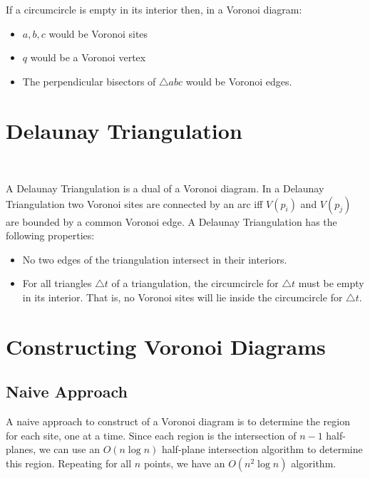 \begin{center}
\end{center}

If a circumcircle is empty in its interior then, in a Voronoi diagram:
\begin{itemize}
\item $a,b,c$ would be Voronoi sites
\item $q$ would be a Voronoi vertex
\item The perpendicular bisectors of $\triangle abc$ would be Voronoi
edges.
\end{itemize}


\section{Delaunay Triangulation}

\begin{center}
 \\
\end{center}
A Delaunay Triangulation is a dual of a Voronoi diagram.  In a
Delaunay Triangulation two Voronoi sites are connected by an arc
iff $V(p_i)$ and $V(p_j)$ are bounded by a common Voronoi edge.  A
Delaunay Triangulation has the following properties:
\begin{itemize}
\item No two edges of the triangulation intersect in their interiors.
\item For all triangles $\triangle t$ of a triangulation, the
circumcircle for $\triangle t$ must be empty in its interior.  That
is, no Voronoi sites will lie inside the circumcircle for $\triangle
t$. 
\end{itemize}

\section{Constructing Voronoi Diagrams}

\subsection{Naive Approach}

A naive approach to construct of a Voronoi diagram is to determine the
region for each site, one at a time.  Since each region is the
intersection of $n-1$ half-planes, we can use an $O(n \log n)$
half-plane intersection algorithm to determine this region.  Repeating
for all $n$ points, we have an $O(n^2 \log n)$ algorithm.

